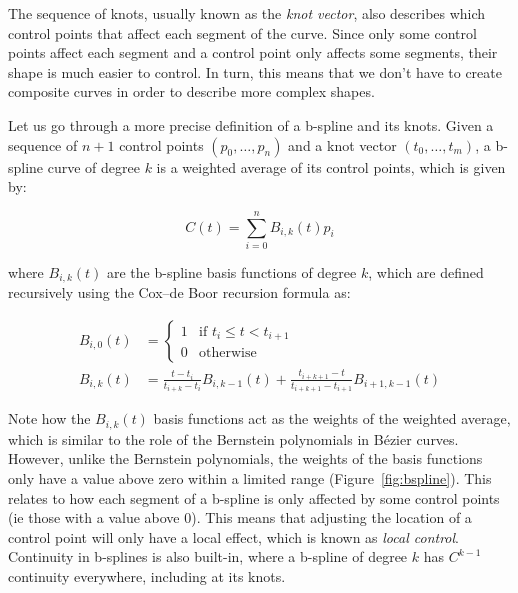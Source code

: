 The sequence of knots, usually known as the \emph{knot vector}, also describes which control points that affect each segment of the curve.
Since only some control points affect each segment and a control point only affects some segments, their shape is much easier to control.
In turn, this means that we don't have to create composite curves in order to describe more complex shapes.

Let us go through a more precise definition of a b-spline and its knots.
Given a sequence of \(n+1\) control points \((p_0, \ldots, p_n)\) and a knot vector 
\((t_0, \ldots, t_m)\), a b-spline curve of degree \(k\) is a weighted average of its control points, which is given by:

\begin{equation}
C(t) = \sum_{i=0}^{n} B_{i,k}(t) p_i
\end{equation}

where \(B_{i,k}(t)\) are the b-spline basis functions of degree \(k\), which are defined recursively using the Cox--de Boor recursion formula as:

\begin{align}
B_{i,0}(t) &= \begin{cases}
1 & \text{if } t_i  \leq t < t_{i+1} \\
0 & \text{otherwise}
\end{cases} \\
B_{i,k}(t) &= \frac{t-t_i}{t_{i+k}-t_i} B_{i,k-1}(t) + \frac{t_{i+k+1}-t}{t_{i+k+1}-t_{i+1}}B_{i+1,k-1}(t)
\end{align}

Note how the \(B_{i,k}(t)\) basis functions act as the weights of the weighted average, which is similar to the role of the Bernstein polynomials in B\'ezier curves.
However, unlike the Bernstein polynomials, the weights of the basis functions only have a value above zero within a limited range (Figure~\ref{fig:bspline}).
This relates to how each segment of a b-spline is only affected by some control points (ie those with a value above 0).
This means that adjusting the location of a control point will only have a local effect, which is known as \emph{local control}.
Continuity in b-splines is also built-in, where a b-spline of degree \(k\) has \(C^{k-1}\) continuity everywhere, including at its knots.

